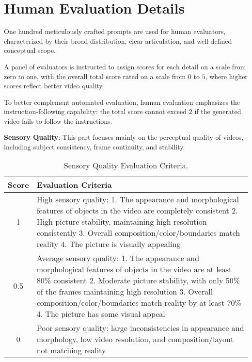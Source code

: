 \clearpage
\section{Human Evaluation Details}\label{sec:human_evalution}

One hundred meticulously crafted prompts are used for human evaluators, characterized by their broad distribution, clear articulation, and well-defined conceptual scope. 

A panel of evaluators is instructed to assign scores for each detail on a scale from zero to one, with the overall total score rated on a scale from $0$ to $5$, where higher scores reflect better video quality. 

To better complement automated evaluation, human evaluation emphasizes the instruction-following capability: the total score cannot exceed $2$ if the generated video fails to follow the instructions.

\textbf{Sensory Quality}: This part focuses mainly on the perceptual quality of videos, including subject consistency, frame continuity, and stability.

\begin{table}[h]
\centering
\caption{Sensory Quality Evaluation Criteria.}
\label{sample-table}
\small

\begin{tabular}{cp{11cm}}
\toprule

\textbf{Score} & \textbf{Evaluation Criteria} \\
\midrule
1  & High sensory quality: 1. The appearance and morphological features of objects in the video are completely consistent 2. High picture stability, maintaining high resolution consistently 3. Overall composition/color/boundaries match reality 4. The picture is visually appealing \\
\midrule
0.5  & Average sensory quality: 1. The appearance and morphological features of objects in the video are at least 80\% consistent 2. Moderate picture stability, with only 50\% of the frames maintaining high resolution 3. Overall composition/color/boundaries match reality by at least 70\% 4. The picture has some visual appeal \\
\midrule
0  & Poor sensory quality: large inconsistencies in appearance and morphology, low video resolution, and composition/layout not matching reality \\

\bottomrule
\end{tabular}
\end{table}

